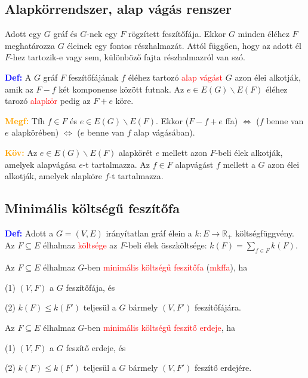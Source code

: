 \documentclass[../szamtud.tex]{subfiles}
\begin{document}
    \subsection{Alapkörrendszer, alap vágás renszer}

        Adott egy $G$ gráf és $G$-nek egy $F$ rögzített feszítőfája. Ekkor $G$ minden éléhez $F$ meghatározza $G$ éleinek egy fontos részhalmazát. Attól függően, hogy az adott él $F$-hez tartozik-e vagy sem, különböző fajta részhalmazról van szó.

        \textcolor{blue}{\textbf{Def:}} A $G$ gráf $F$ feszítőfájának $f$ éléhez tartozó \textcolor{red}{alap vágást} $G$ azon élei alkotják, amik az $F-f$ két komponense között futnak. Az $e \in E(G) \backslash E(F)$ éléhez tarozó \textcolor{red}{alapkör} pedig az $F+e$ köre.

        \textcolor{orange}{\textbf{Megf:}} Tfh $f \in F$ és $e \in E(G) \backslash E(F)$. Ekkor ($F-f+e$ ffa) $\Longleftrightarrow$ ($f$ benne van $e$ alapkörében) $\Longleftrightarrow$ ($e$ benne van $f$ alap vágásában).

        \textcolor{orange}{\textbf{Köv:}} Az $e \in E(G) \backslash E(F)$ alapkörét $e$ mellett azon $F$-beli élek alkotják, amelyek alapvágása $e$-t tartalmazza. Az $f \in F$ alapvágást $f$ mellett a $G$ azon élei alkotják, amelyek alapköre $f$-t tartalmazza.

    \subsection{Minimális költségű feszítőfa}

        \textcolor{blue}{\textbf{Def:}} Adott a $G = (V,E)$ irányítatlan gráf élein a $k:E \rightarrow \mathbb{R}_+$ költségfüggvény. Az $F \subseteq E$ élhalmaz \textcolor{red}{költsége} az $F$-beli élek összköltsége: $k(F) = \sum_{f\in F}k(F)$.

        Az $F \subseteq E$ élhalmaz $G$-ben \textcolor{red}{minimális költségű feszítőfa} (\textcolor{red}{mkffa}), ha 

        (1) $(V,F)$ a $G$ feszítőfája, és
        
        (2) $k(F) \leq k(F')$ teljesül a $G$ bármely $(V,F')$ feszítőfájára.
        
        Az $F \subseteq E$ élhalmaz $G$-ben \textcolor{red}{minimális költségű feszítő erdeje}, ha 

        (1) $(V,F)$ a $G$ feszítő erdeje, és

        (2) $k(F) \leq k(F')$ teljesül a $G$ bármely $(V,F')$ feszítő erdejére.
\end{document}

